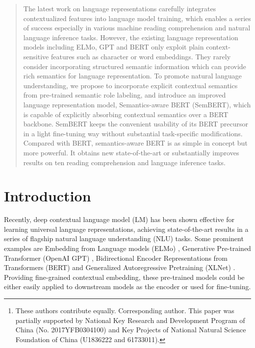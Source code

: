 \documentclass[letterpaper]{article} \usepackage{aaai20}  \usepackage{times}  \usepackage{helvet} \usepackage{courier}  \usepackage[hyphens]{url}  \usepackage{graphicx} \urlstyle{rm} \def\UrlFont{\rm}  \usepackage{graphicx}  \frenchspacing  \usepackage{amssymb}
\author{
	Zhuosheng Zhang\textsuperscript{\rm 1,2,3,\thanks{These authors contribute equally. Corresponding author. This paper was partially supported by National Key Research and Development Program of China (No. 2017YFB0304100) and Key Projects of National Natural Science Foundation of China (U1836222 and 61733011).}},
	Yuwei Wu\textsuperscript{\rm 1,2,3,4,*},
	Hai Zhao\textsuperscript{\rm 1,2,3,},
	Zuchao Li\textsuperscript{\rm 1,2,3}, \\
	\large \textbf{ 
		Shuailiang Zhang\textsuperscript{\rm 1,2,3},
		Xi Zhou\textsuperscript{\rm 5},
		Xiang Zhou\textsuperscript{\rm 5}
	}
	\\
	\textsuperscript{\rm 1}Department of Computer Science and Engineering, Shanghai Jiao Tong University\\
	\textsuperscript{\rm 2}Key Laboratory of Shanghai Education Commission for Intelligent Interaction\\
	and Cognitive Engineering, Shanghai Jiao Tong University, Shanghai, China\\
	\textsuperscript{\rm 3}MoE Key Lab of Artificial Intelligence, AI Institute, Shanghai Jiao Tong University, Shanghai, China\\
	\textsuperscript{\rm 4}College of Zhiyuan, Shanghai Jiao Tong University, China\\
	\textsuperscript{\rm 5}CloudWalk Technology, Shanghai, China\\
	{\tt \{zhangzs,will8821\}@sjtu.edu.cn, zhaohai@cs.sjtu.edu.cn} \\
}
\begin{document}
\maketitle

\begin{abstract}

	The latest work on language representations carefully integrates contextualized features into language model training, which enables a series of success especially in various machine reading comprehension and natural language inference tasks. However, the existing language representation models including ELMo, GPT and BERT only exploit plain context-sensitive features such as character or word embeddings. They rarely consider incorporating structured semantic information which can provide rich semantics for language representation. To promote natural language understanding, we propose to incorporate explicit contextual semantics from pre-trained semantic role labeling, and introduce an improved language representation model, Semantics-aware BERT (SemBERT), which is capable of explicitly absorbing contextual semantics over a BERT backbone. SemBERT keeps the convenient usability of its BERT precursor in a light fine-tuning way without substantial task-specific modifications. Compared with BERT, semantics-aware BERT is as simple in concept but more powerful. It obtains new state-of-the-art or substantially improves results on ten reading comprehension and language inference tasks. 

\end{abstract}

\section{Introduction}

Recently, deep contextual language model (LM) has been shown effective for learning universal language representations, achieving state-of-the-art results in a series of flagship natural language understanding (NLU) tasks. Some prominent examples are Embedding from Language models (ELMo) \cite{Peters2018ELMO}, Generative Pre-trained Transformer (OpenAI GPT)  \cite{radford2018improving}, Bidirectional Encoder Representations from Transformers (BERT) \cite{devlin2018bert} and Generalized Autoregressive Pretraining (XLNet) \cite{yang2019xlnet}. Providing fine-grained contextual embedding, these pre-trained models could be either easily applied to downstream models as the encoder or used for fine-tuning. 
\end{document}
